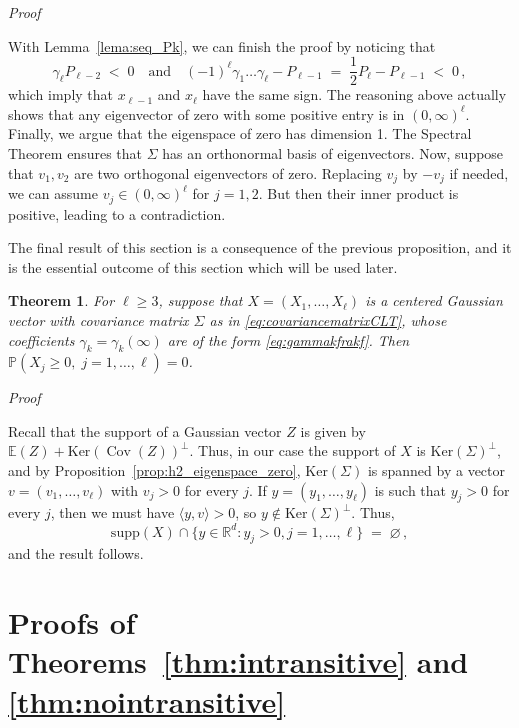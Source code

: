 \documentclass[reqno,a4paper,11pt]{amsart}
\makeatletter
\newtheorem{theorem}[lemma]{Theorem}
\theoremstyle{remark}
\newcommand{\bb}[1]{{\mathbb #1}}
\numberwithin{equation}{section}
\newcommand{\cov}[1]{\operatorname{Cov}\left(#1\right)}
\renewenvironment{proof}[1][Proof]{\par
\pushQED{\qed}%
\normalfont \topsep6\p@\@plus6\p@\relax
\trivlist
\item\relax
{\itshape
#1\@addpunct{.}}\hspace\labelsep\ignorespaces
}{%
\popQED\endtrivlist\@endpefalse
}
\makeatother
\begin{document}
\begin{proof}
With Lemma~\ref{lema:seq_Pk}, we can finish the proof by noticing that
\begin{equation*}
\gamma_\ell P_{\ell-2} \;<\;0
\quad \text{and} \quad
(-1)^{\ell}\gamma_1\dots\gamma_\ell - P_{\ell-1}
\;=\; \frac{1}{2}P_{\ell} - P_{\ell-1} \;<\; 0\,,
\end{equation*}
which imply that $x_{\ell-1}$ and $x_{\ell}$ have the same sign. The reasoning
above actually shows that any eigenvector of zero with some positive entry is in $(0,\infty)^\ell$. Finally, we argue that the eigenspace of zero
has dimension 1. The Spectral Theorem ensures that $\Sigma$ has
an orthonormal basis of eigenvectors. Now, suppose that $v_1, v_2$ are two
orthogonal eigenvectors of zero. Replacing $v_j$ by $-v_j$ if needed, we can
assume $v_j \in (0, \infty)^\ell$ for $j=1,2$. But then their inner product is
positive, leading to a contradiction.
\end{proof}

The final result of this section is a consequence of the previous proposition, and it is the essential outcome of this section which will be used later.

\begin{theorem}\label{thm:probabilitieszero}
For $\ell\geq 3$, suppose that $X=(X_1,\hdots, X_\ell)$ is a centered Gaussian vector with covariance matrix $\Sigma$ as in \eqref{eq:covariancematrixCLT}, whose coefficients $\gamma_k=\gamma_k(\infty)$ are of the form \eqref{eq:gammakfrakf}. Then
$\bb P(X_j\geq 0,\;  j=1,\hdots, \ell)=0$.
\end{theorem}
\begin{proof}
Recall that the support of a Gaussian vector $Z$ is given by $\bb E(Z)+\mathrm{Ker}(\cov{Z})^\perp$. Thus, in our case the support of $X$ is $\mathrm{Ker}(\Sigma)^\perp$, and by Proposition~\ref{prop:h2_eigenspace_zero}, $\mathrm{Ker}(\Sigma)$ is spanned by a vector $v=(v_1,\hdots,v_\ell)$ with $v_j>0$ for every $j$. If $y=(y_1,\hdots,y_\ell)$ is such that $y_j>0$ for every $j$, then we must have $\langle y,v\rangle >0$, so $y\notin \mathrm{Ker}(\Sigma)^\perp$. Thus,
%
    $$
        \mathrm{supp}(X)\cap \{y\in \bb R^d: y_j>0, j=1,\hdots, \ell\}\;=\;\varnothing\,,
    $$
%
and the result follows.
\end{proof}


\section{Proofs of Theorems~\ref{thm:intransitive} and \ref{thm:nointransitive}}\label{s:thms5_and_6}
\end{document}
